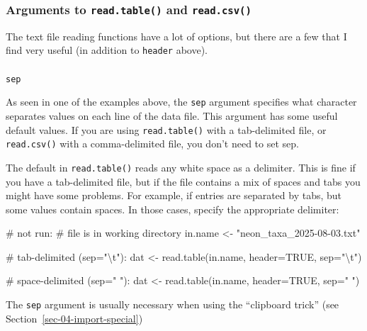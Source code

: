 \documentclass[
  13,
  letterpaper,
]{report}
\makeatletter
\let\oldparagraph\paragraph
\renewcommand{\paragraph}{
    \@ifstar
      \xxxParagraphStar
      \xxxParagraphNoStar
  }
\newcommand{\xxxParagraphStar}[1]{\oldparagraph*{#1}\mbox{}}
\newcommand{\xxxParagraphNoStar}[1]{\oldparagraph{#1}\mbox{}}
\newenvironment{Shaded}{\begin{snugshade}}{\end{snugshade}}
\newcommand{\AttributeTok}[1]{\textcolor[rgb]{0.40,0.45,0.13}{#1}}
\newcommand{\CommentTok}[1]{\textcolor[rgb]{0.37,0.37,0.37}{#1}}
\newcommand{\ConstantTok}[1]{\textcolor[rgb]{0.56,0.35,0.01}{#1}}
\newcommand{\FunctionTok}[1]{\textcolor[rgb]{0.28,0.35,0.67}{#1}}
\newcommand{\NormalTok}[1]{\textcolor[rgb]{0.00,0.23,0.31}{#1}}
\newcommand{\OtherTok}[1]{\textcolor[rgb]{0.00,0.23,0.31}{#1}}
\newcommand{\SpecialCharTok}[1]{\textcolor[rgb]{0.37,0.37,0.37}{#1}}
\newcommand{\StringTok}[1]{\textcolor[rgb]{0.13,0.47,0.30}{#1}}
\makeatother
\begin{document}
\subsubsection{\texorpdfstring{Arguments to \texttt{read.table()} and
\texttt{read.csv()}}{Arguments to read.table() and read.csv()}}\label{sec-04-import-text-args}

The text file reading functions have a lot of options, but there are a
few that I find very useful (in addition to \texttt{header} above).

\paragraph{\texorpdfstring{\texttt{sep}}{sep}}\label{sep}

As seen in one of the examples above, the \texttt{sep} argument
specifies what character separates values on each line of the data file.
This argument has some useful default values. If you are using
\texttt{read.table()} with a tab-delimited file, or \texttt{read.csv()}
with a comma-delimited file, you don't need to set sep.

The default in \texttt{read.table()} reads any white space as a
delimiter. This is fine if you have a tab-delimited file, but if the
file contains a mix of spaces and tabs you might have some problems. For
example, if entries are separated by tabs, but some values contain
spaces. In those cases, specify the appropriate delimiter:

\begin{Shaded}
\begin{Highlighting}[]
\CommentTok{\# not run:}
\CommentTok{\# file is in working directory}
\NormalTok{in.name }\OtherTok{\textless{}{-}} \StringTok{"neon\_taxa\_2025{-}08{-}03.txt"}

\CommentTok{\# tab{-}delimited (sep="\textbackslash{}t"):}
\NormalTok{dat }\OtherTok{\textless{}{-}} \FunctionTok{read.table}\NormalTok{(in.name, }\AttributeTok{header=}\ConstantTok{TRUE}\NormalTok{, }\AttributeTok{sep=}\StringTok{"}\SpecialCharTok{\textbackslash{}t}\StringTok{"}\NormalTok{)}

\CommentTok{\# space{-}delimited (sep=" "): }
\NormalTok{dat }\OtherTok{\textless{}{-}} \FunctionTok{read.table}\NormalTok{(in.name, }\AttributeTok{header=}\ConstantTok{TRUE}\NormalTok{, }\AttributeTok{sep=}\StringTok{" "}\NormalTok{)}
\end{Highlighting}
\end{Shaded}

The \texttt{sep} argument is usually necessary when using the
``clipboard trick'' (see Section~\ref{sec-04-import-special})
\end{document}
